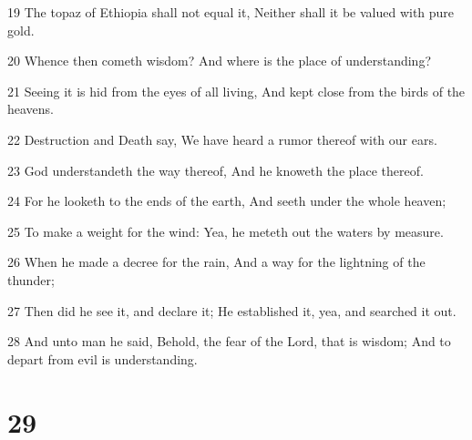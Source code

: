 \par 19 The topaz of Ethiopia shall not equal it, Neither shall it be valued with pure gold.
\par 20 Whence then cometh wisdom? And where is the place of understanding?
\par 21 Seeing it is hid from the eyes of all living, And kept close from the birds of the heavens.
\par 22 Destruction and Death say, We have heard a rumor thereof with our ears.
\par 23 God understandeth the way thereof, And he knoweth the place thereof.
\par 24 For he looketh to the ends of the earth, And seeth under the whole heaven;
\par 25 To make a weight for the wind: Yea, he meteth out the waters by measure.
\par 26 When he made a decree for the rain, And a way for the lightning of the thunder;
\par 27 Then did he see it, and declare it; He established it, yea, and searched it out.
\par 28 And unto man he said, Behold, the fear of the Lord, that is wisdom; And to depart from evil is understanding.

\chapter{29}

